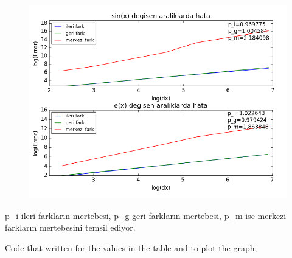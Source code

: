 \documentclass[paper=a4, fontsize=11pt]{scrartcl} %
\newif\ifcomment
\numberwithin{equation}{section} %
\numberwithin{figure}{section} %
\numberwithin{table}{section} %
\begin{document}
\begin{figure}[h]
\centering
\includegraphics[scale=0.7]{graph3}
\end{figure}
p\_i ileri farklar{\i}n mertebesi, p\_g geri farklar{\i}n mertebesi, p\_m ise merkezi farklar{\i}n mertebesini temsil ediyor.

\ifcomment
Code that written for the values in the table and to plot the graph;
\end{document}
